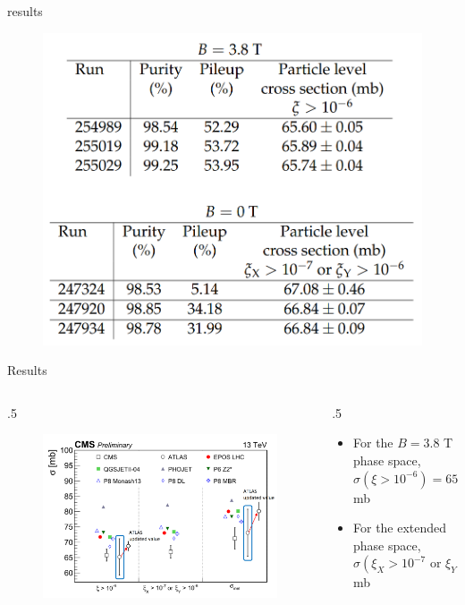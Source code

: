 \documentclass[aspectratio=169,xcolor=dvipsnames]{beamer}
\begin{document}
\begin{frame}{results}
	\begin{figure}
		\centering
		\includegraphics[width=0.5\linewidth]{screenshot009}
	\end{figure}
\end{frame}

\begin{frame}{Results}
	\begin{columns}
		\begin{column}{.5\textwidth}
			\begin{figure}
				\centering
				\includegraphics[width=\linewidth]{screenshot007}
			\end{figure}
		\end{column}
		\begin{column}{.5\textwidth}
			\begin{itemize}
				\item For the $B=3.8$ T phase space,\\
				$\sigma(\xi > 10^{-6}) = 65.77 \pm 0.03_\text{stat.} \pm 0.76_\text{sys.} \pm 1.78_\text{lum.} $ mb 
				\vspace{0.1in}
				\item For the extended phase space,\\
				$\sigma(\xi_X > 10^{-7} \text{ or } \xi_Y > 10^{-6} ) = 66.85 \pm 0.06_\text{stat.} \pm 0.44_\text{sys.} \pm 1.96_\text{lum.} $ mb
			\end{itemize}
		\end{column}
	\end{columns}
\end{frame}
\end{document}
